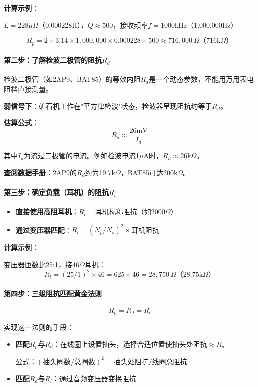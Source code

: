 \textbf{计算示例}：

$L = 228\mu H$（0.000228H），$Q \approx 500$，接收频率$f = 1000$kHz（1,000,000Hz）

$$R_p = 2 \times 3.14 \times 1,000,000 \times 0.000228 \times 500 \approx 716,000\ \Omega \text{（716k}\Omega\text{）}$$

\paragraph{第二步：了解检波二极管的阻抗$R_d$}

检波二极管（如2AP9、BAT85）的等效内阻$R_d$是一个动态参数，不能用万用表电阻档直接测量。

\textbf{弱信号下}：矿石机工作在"平方律检波"状态，检波器呈现阻抗约等于$R_d$。

\textbf{估算公式}：
\begin{equation}
R_d \approx \frac{26\text{mV}}{I_d}
\end{equation}

其中$I_d$为流过二极管的电流。例如检波电流1$\mu$A时，$R_d \approx 26$k$\Omega$。

\textbf{查阅数据手册}：2AP9的$R_d$约为19.7k$\Omega$，BAT85可达200k$\Omega$。

\paragraph{第三步：确定负载（耳机）的阻抗$R_l$}

\begin{itemize}
    \item \textbf{直接使用高阻耳机}：$R_l = $耳机标称阻抗（如2000$\Omega$）
    \item \textbf{通过变压器匹配}：$R_l = (N_p/N_s)^2 \times $耳机阻抗
\end{itemize}

\textbf{计算示例}：

变压器匝数比25:1，接46$\Omega$耳机：
$$R_l = (25/1)^2 \times 46 = 625 \times 46 = 28{,}750\ \Omega \text{（28.75k}\Omega\text{）}$$

\paragraph{第四步：三级阻抗匹配黄金法则}

\begin{equation}
R_p = R_d = R_l
\label{eq:impedance_match_rule}
\end{equation}

实现这一法则的手段：
\begin{itemize}
    \item \textbf{匹配$R_p$与$R_d$}：在线圈上设置抽头，选择合适位置使抽头处阻抗$\approx R_d$
    
    公式：$(\text{抽头圈数} / \text{总圈数})^2 = \text{抽头处阻抗} / \text{线圈总阻抗}$
    
    \item \textbf{匹配$R_d$与$R_l$}：通过音频变压器变换阻抗
\end{itemize}

